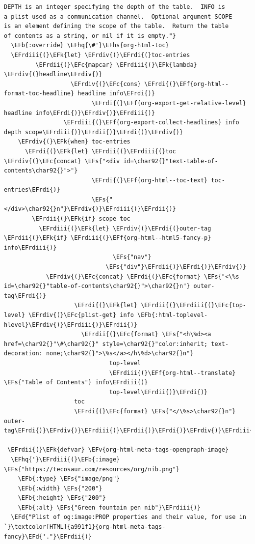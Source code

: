 \documentclass{scrartcl}
\newcommand{\EFk}[1]{\textcolor{EFk}{#1}} %
\newcommand{\EFd}[1]{\textcolor{EFd}{#1}} %
\newcommand{\EFs}[1]{\textcolor{EFs}{#1}} %
\newcommand{\EFb}[1]{\textcolor{EFb}{#1}} %
\newcommand{\EFc}[1]{\textcolor{EFc}{#1}} %
\newcommand{\EFv}[1]{\textcolor{EFv}{#1}} %
\newcommand{\EFf}[1]{\textcolor{EFf}{#1}} %
\newcommand{\EFhq}[1]{#1} %
\newcommand{\EFhs}[1]{#1} %
\newcommand{\EFrdi}[1]{#1} %
\newcommand{\EFrdii}[1]{#1} %
\newcommand{\EFrdiii}[1]{#1} %
\newcommand{\EFrdiv}[1]{#1} %
\begin{document}
\begin{Code}
\begin{Verbatim}[]
DEPTH is an integer specifying the depth of the table.  INFO is
a plist used as a communication channel.  Optional argument SCOPE
is an element defining the scope of the table.  Return the table
of contents as a string, or nil if it is empty."}
  \EFb{:override} \EFhq{\#'}\EFhs{org-html-toc}
  \EFrdiii{(}\EFk{let} \EFrdiv{(}\EFrdi{(}toc-entries
         \EFrdii{(}\EFc{mapcar} \EFrdiii{(}\EFk{lambda} \EFrdiv{(}headline\EFrdiv{)}
                   \EFrdiv{(}\EFc{cons} \EFrdi{(}\EFf{org-html--format-toc-headline} headline info\EFrdi{)}
                         \EFrdi{(}\EFf{org-export-get-relative-level} headline info\EFrdi{)}\EFrdiv{)}\EFrdiii{)}
                 \EFrdiii{(}\EFf{org-export-collect-headlines} info depth scope\EFrdiii{)}\EFrdii{)}\EFrdi{)}\EFrdiv{)}
    \EFrdiv{(}\EFk{when} toc-entries
      \EFrdi{(}\EFk{let} \EFrdii{(}\EFrdiii{(}toc \EFrdiv{(}\EFc{concat} \EFs{"<div id=\char92{}"text-table-of-contents\char92{}">"}
                         \EFrdi{(}\EFf{org-html--toc-text} toc-entries\EFrdi{)}
                         \EFs{"</div>\char92{}n"}\EFrdiv{)}\EFrdiii{)}\EFrdii{)}
        \EFrdii{(}\EFk{if} scope toc
          \EFrdiii{(}\EFk{let} \EFrdiv{(}\EFrdi{(}outer-tag \EFrdii{(}\EFk{if} \EFrdiii{(}\EFf{org-html--html5-fancy-p} info\EFrdiii{)}
                               \EFs{"nav"}
                             \EFs{"div"}\EFrdii{)}\EFrdi{)}\EFrdiv{)}
            \EFrdiv{(}\EFc{concat} \EFrdi{(}\EFc{format} \EFs{"<\%s id=\char92{}"table-of-contents\char92{}">\char92{}n"} outer-tag\EFrdi{)}
                    \EFrdi{(}\EFk{let} \EFrdii{(}\EFrdiii{(}\EFc{top-level} \EFrdiv{(}\EFc{plist-get} info \EFb{:html-toplevel-hlevel}\EFrdiv{)}\EFrdiii{)}\EFrdii{)}
                      \EFrdii{(}\EFc{format} \EFs{"<h\%d><a href=\char92{}"\#\char92{}" style=\char92{}"color:inherit; text-decoration: none;\char92{}">\%s</a></h\%d>\char92{}n"}
                              top-level
                              \EFrdiii{(}\EFf{org-html--translate} \EFs{"Table of Contents"} info\EFrdiii{)}
                              top-level\EFrdii{)}\EFrdi{)}
                    toc
                    \EFrdi{(}\EFc{format} \EFs{"</\%s>\char92{}n"} outer-tag\EFrdi{)}\EFrdiv{)}\EFrdiii{)}\EFrdii{)}\EFrdi{)}\EFrdiv{)}\EFrdiii{)}\EFrdii{)}

 \EFrdii{(}\EFk{defvar} \EFv{org-html-meta-tags-opengraph-image}
  \EFhq{'}\EFrdiii{(}\EFb{:image} \EFs{"https://tecosaur.com/resources/org/nib.png"}
    \EFb{:type} \EFs{"image/png"}
    \EFb{:width} \EFs{"200"}
    \EFb{:height} \EFs{"200"}
    \EFb{:alt} \EFs{"Green fountain pen nib"}\EFrdiii{)}
  \EFd{"Plist of og:image:PROP properties and their value, for use in `}\textcolor[HTML]{a991f1}{org-html-meta-tags-fancy}\EFd{'."}\EFrdii{)}


\end{Verbatim}
\end{Code}
\end{document}
